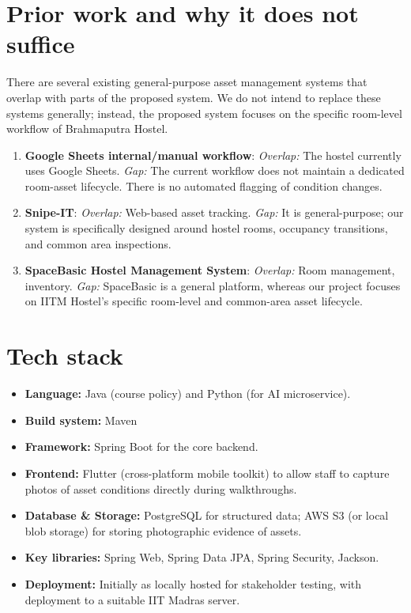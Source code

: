 \documentclass[11pt,a4paper]{article}
\begin{document}
\section{Prior work and why it does not suffice}
There are several existing general-purpose asset management systems that overlap with parts of the proposed system. We do not intend to replace these systems generally; instead, the proposed system focuses on the specific room-level workflow of Brahmaputra Hostel.
\begin{enumerate}
    \item \textbf{Google Sheets internal/manual workflow}: 
    \textit{Overlap:} The hostel currently uses Google Sheets.
    \textit{Gap:} The current workflow does not maintain a dedicated room-asset lifecycle. There is no automated flagging of condition changes.
    \item \textbf{Snipe-IT}:
    \textit{Overlap:} Web-based asset tracking.
    \textit{Gap:} It is general-purpose; our system is specifically designed around hostel rooms, occupancy transitions, and common area inspections.
    \item \textbf{SpaceBasic Hostel Management System}:
    \textit{Overlap:} Room management, inventory.
    \textit{Gap:} SpaceBasic is a general platform, whereas our project focuses on IITM Hostel's specific room-level and common-area asset lifecycle.
\end{enumerate}

\section{Tech stack}
\begin{itemize}[noitemsep]
    \item \textbf{Language:} Java (course policy) and Python (for AI microservice).
    \item \textbf{Build system:} Maven
    \item \textbf{Framework:} Spring Boot for the core backend.
    \item \textbf{Frontend:} Flutter (cross-platform mobile toolkit) to allow staff to capture photos of asset conditions directly during walkthroughs.
    \item \textbf{Database \& Storage:} PostgreSQL for structured data; AWS S3 (or local blob storage) for storing photographic evidence of assets.
    \item \textbf{Key libraries:} Spring Web, Spring Data JPA, Spring Security, Jackson.
    \item \textbf{Deployment:} Initially as locally hosted for stakeholder testing, with deployment to a suitable IIT Madras server.
\end{itemize}
\end{document}
